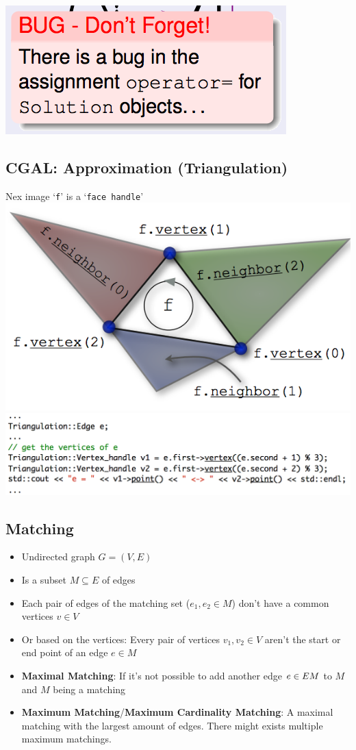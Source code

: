 \documentclass[a4paper,titlepage]{article}
\begin{document}
\includegraphics{_useful-snippets/lp_qp5.png}

\subsection{CGAL: Approximation (Triangulation)}
Nex image `\texttt{f}' is a `\texttt{face handle}'\\
\includegraphics{_useful-snippets/cgal0.png}\\
\includegraphics{_useful-snippets/cgal1.png}

\subsection{Matching}
\begin{itemize}
\item Undirected graph $G = (V, E)$
\item Is a subset $M \subseteq E$ of edges
\item Each pair of edges of the matching set ($e_1, e_2 \in M$) don't have a common vertices $v \in V$
\item Or based on the vertices: Every pair of vertices $v_1, v_2 \in V$ aren't the start or end point of an edge $e \in M$
\item \textbf{Maximal Matching}: If it's not possible to add another edge $e \in E \\ M$ to $M$ and $M$ being a matching
\item \textbf{Maximum Matching}/\textbf{Maximum Cardinality Matching}: A maximal matching with the largest amount of edges. There might exists multiple maximum matchings.
\end{itemize}
\end{document}
